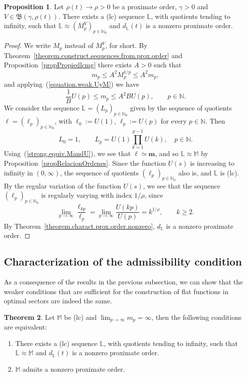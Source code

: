 \documentclass[11pt,a4paper]{article}
\theoremstyle{definition}
\newtheorem{theo}{Theorem}[section]
\newtheorem{pro}[theo]{Proposition}
\newenvironment{prop}{\smallskip\begin{pro}}{\end{pro}\smallskip}
\def\oo{\infty}
\def\ri{\rightarrow}
\def\ga{\gamma}
\def\ro{\rho}
\def\Bet{\mathfrak{B}}
\def\bl{\boldsymbol{\ell}}
\def\N{\mathbb{N}}
\def\M{\mathbb{M}}
\def\L{\mathbb{L}} %
\def\bm{\boldsymbol{m}}
\begin{document}
\begin{prop}\label{pro.suc.equiv.d.proxorder}
   Let $\ro(t) \ri \ro>0$ be a proximate order,  $\ga>0$ and $V \in \Bet(\ga, \ro(t) )$. There exists a (lc) sequence $\L$, with quotients tending to infinity, such that $\L\approx(M^V_p)_{p\in\N_0}$ and $d_{\L}(t)$ is a nonzero proximate order.
\end{prop}
\begin{proof}
We write $M_p$ instead of $M_p^V$, for short. By Theorem~\ref{theorem.construct.sequences.from.prox.order} and Proposition~\ref{propPropiedlcmg} there exists $A>0$ such that
  $$m_{p}\le A^{2}M_{p}^{1/p}\le A^{2}m_{p},$$
and applying~(\ref{equation.weak.UyM}) we have
 \begin{equation}\label{strong.equiv.MandU}
  \frac{1}{B} U(p)\leq m_p\leq A^2 B  U(p), \qquad p\in\N.
 \end{equation}
 We consider the sequence $\L=(L_p)_{p\in\N_0}$ given by the sequence of quotients $\bl=(\ell_p)_{p\in\N_0}$, with   $\ell_0:=U(1)$, $\ell_p:=U(p)$ for every $p\in\N$. Then
 $$L_0=1,\qquad L_p=U(1)\prod_{k=1}^{p-1} U(k), \quad p\in\N.$$
 Using~(\ref{strong.equiv.MandU}), we see that $\bl\simeq\bm$, and so $\L \approx \M$ by Proposition~\ref{propRelacionOrdenes}. Since the function $U(s)$ is increasing to infinity in $(0,\oo)$, the sequence of quotients $(\ell_p)_{p\in\N_0}$ also is, and $\L$ is (lc).
By the regular variation of the function $U(s)$, we see that
 the sequence $(\ell_p)_{p\in\N_0}$ is regularly varying with index $1/\ro$, since
 $$\lim_{p\ri\oo} \frac{\ell_{k p}}{\ell_p} = \lim_{p\ri\oo} \frac{U(kp)}{U(p)}=k^{1/\ro}, \qquad k \geq2.$$
By Theorem~\ref{theorem.charact.prox.order.nonzero}, $d_{\L}$ is a nonzero proximate order.
 \end{proof}



\subsection{Characterization of the admissibility condition}




As a consequence of the results in the previous subsection, we can show that the weaker conditions that are sufficient for the construction of flat functions in optimal sectors are indeed the same.

\begin{theo}\label{theo.charact.admit.p.o}
Let $\M$ be (lc) and $\lim_{p\ri\oo} m_p=\oo$, then the following conditions are equivalent:
\begin{enumerate}
 \item[(e)] There exists a (lc) sequence $\L$, with quotients tending to infinity, such that $\L\approx\M$ and $d_{\L}(t)$ is a nonzero proximate order.
 \item[(f)] $\M$ admits a nonzero proximate order.
\end{enumerate}
\end{theo}
\end{document}
